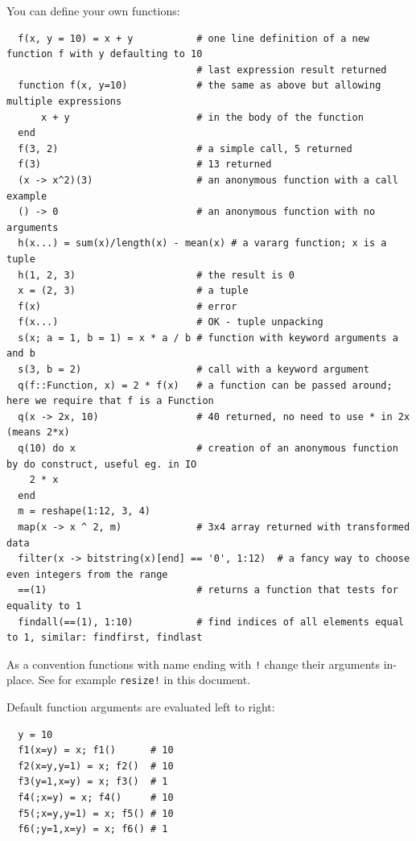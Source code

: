 \documentclass[10pt,a4paper]{article}
\begin{document}
You can define your own functions:
\begin{lstlisting}
  f(x, y = 10) = x + y           # one line definition of a new function f with y defaulting to 10
                                 # last expression result returned
  function f(x, y=10)            # the same as above but allowing multiple expressions
      x + y                      # in the body of the function
  end
  f(3, 2)                        # a simple call, 5 returned
  f(3)                           # 13 returned
  (x -> x^2)(3)                  # an anonymous function with a call example
  () -> 0                        # an anonymous function with no arguments
  h(x...) = sum(x)/length(x) - mean(x) # a vararg function; x is a tuple
  h(1, 2, 3)                     # the result is 0
  x = (2, 3)                     # a tuple
  f(x)                           # error
  f(x...)                        # OK - tuple unpacking
  s(x; a = 1, b = 1) = x * a / b # function with keyword arguments a and b
  s(3, b = 2)                    # call with a keyword argument
  q(f::Function, x) = 2 * f(x)   # a function can be passed around; here we require that f is a Function
  q(x -> 2x, 10)                 # 40 returned, no need to use * in 2x (means 2*x)
  q(10) do x                     # creation of an anonymous function by do construct, useful eg. in IO
    2 * x
  end
  m = reshape(1:12, 3, 4)
  map(x -> x ^ 2, m)             # 3x4 array returned with transformed data
  filter(x -> bitstring(x)[end] == '0', 1:12)  # a fancy way to choose even integers from the range
  ==(1)                          # returns a function that tests for equality to 1
  findall(==(1), 1:10)           # find indices of all elements equal to 1, similar: findfirst, findlast
\end{lstlisting}

As a convention functions with name ending with \lstinline|!| change their arguments in-place. See for example \lstinline|resize!| in this document.

Default function arguments are evaluated left to right:
\begin{lstlisting}
  y = 10
  f1(x=y) = x; f1()      # 10
  f2(x=y,y=1) = x; f2()  # 10
  f3(y=1,x=y) = x; f3()  # 1
  f4(;x=y) = x; f4()     # 10
  f5(;x=y,y=1) = x; f5() # 10
  f6(;y=1,x=y) = x; f6() # 1
\end{lstlisting}
\end{document}
